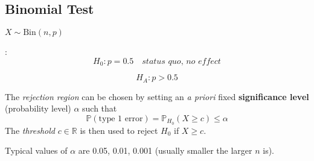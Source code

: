 \renewcommand{\arraystretch}{1}
\setlength\tabcolsep{\oldtabcolsep}


\subsection{Binomial Test}
$X\sim \mathrm{Bin}(n,p)$

:
\noindent\begin{equation*}
    H_0: p=0.5\quad \textit{status quo, no effect}
\end{equation*}

\noindent\begin{equation*}
    H_A: p>0.5
\end{equation*}


The \textit{rejection region} can be chosen by setting an \textit{a priori} fixed \textbf{significance level} (probability level) $\alpha$ such that
\noindent\begin{equation*}
    \mathbb{P}(\text{type 1 error}) = \mathbb{P}_{H_0}(X\geq c) \leq \alpha
\end{equation*}
The \textit{threshold} $c\in \mathbb{R}$ is then used to reject $H_0$ if $X\geq c$.

Typical values of $\alpha$ are 0.05, 0.01, 0.001 (usually smaller the larger $n$ is).

